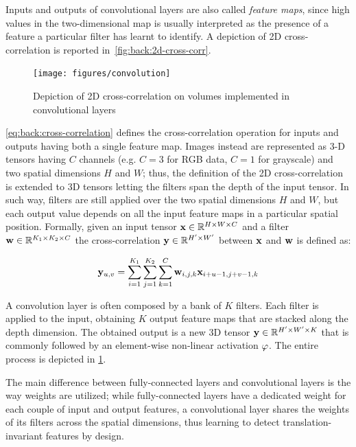 Inputs and outputs of convolutional layers are also called \emph{feature maps}, since high values in the two-dimensional map is usually interpreted as the presence of a feature a particular filter has learnt to identify.
A depiction of 2D cross-correlation is reported in~\ref{fig:back:2d-cross-corr}.

\begin{figure}
    \centering
    \texttt{[image: figures/convolution]}
    \caption{Depiction of 2D cross-correlation on volumes implemented in convolutional layers}
    \label{fig:back:convolution}
\end{figure}

\ref{eq:back:cross-correlation} defines the cross-correlation operation for inputs and outputs having both a single feature map.
Images instead are represented as 3-D tensors having $C$ channels (e.g. $C=3$ for RGB data, $C=1$ for grayscale) and two spatial dimensions $H$ and $W$;
thus, the definition of the 2D cross-correlation is extended to 3D tensors letting the filters span the depth of the input tensor.
In such way, filters are still applied over the two spatial dimensions $H$ and $W$, but each output value depends on all the input feature maps in a particular spatial position.
Formally, given an input tensor $\mathbf{x} \in \mathbb{R}^{H \times W \times C}$ and a filter $\mathbf{w} \in \mathbb{R}^{K_1 \times K_2 \times C}$ the cross-correlation $\mathbf{y} \in \mathbb{R}^{H' \times W'}$ between $\mathbf{x}$ and $\mathbf{w}$ is defined as:

\begin{equation}\label{eq:back:channel-cross-correlation}
    \mathbf{y}_{u,v} = \sum_{i=1}^{K_1} \sum_{j=1}^{K_2} \sum_{k=1}^C \mathbf{w}_{i,j,k} \mathbf{x}_{i+u-1,j+v-1,k}
\end{equation}

A convolution layer is often composed by a bank of $K$ filters.
Each filter is applied to the input, obtaining $K$ output feature maps that are stacked along the depth dimension.
The obtained output is a new 3D tensor $\mathbf{y} \in \mathbb{R}^{H' \times W' \times K}$ that is commonly followed by an element-wise non-linear activation $\varphi$.
The entire process is depicted in \ref{fig:back:convolution}.

The main difference between fully-connected layers and convolutional layers is the way weights are utilized;
while fully-connected layers have a dedicated weight for each couple of input and output features, a convolutional layer shares the weights of its filters across the spatial dimensions, thus learning to detect translation-invariant features by design.

